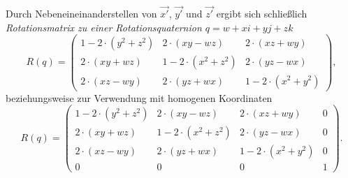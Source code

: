 Durch Nebeneineinanderstellen von $\vec{x'}$, $\vec{y'}$ und $\vec{z'}$ ergibt sich schließlich \emph{Rotationsmatrix zu einer Rotationsquaternion $q = w + xi + yj + zk$}
\begin{equation}
 R(q) =
 \begin{pmatrix}
  1 - 2 \cdot ( y^2 + z^2 ) & 2 \cdot ( xy - wz ) & 2 \cdot ( xz + wy ) \\
  2 \cdot ( xy + wz ) & 1 - 2 \cdot ( x^2 + z^2 ) & 2 \cdot ( yz - wx ) \\
  2 \cdot ( xz - wy ) & 2 \cdot ( yz + wx ) & 1 - 2 \cdot ( x^2 + y^2 )
 \end{pmatrix},
\end{equation}
beziehungsweise zur Verwendung mit homogenen Koordinaten
\begin{equation}
 R(q) =
 \begin{pmatrix}
  1 - 2 \cdot ( y^2 + z^2 ) & 2 \cdot ( xy - wz ) & 2 \cdot ( xz + wy ) & 0 \\
  2 \cdot ( xy + wz ) & 1 - 2 \cdot ( x^2 + z^2 ) & 2 \cdot ( yz - wx ) & 0 \\
  2 \cdot ( xz - wy ) & 2 \cdot ( yz + wx ) & 1 - 2 \cdot ( x^2 + y^2 ) & 0 \\
  0 & 0 & 0 & 1
 \end{pmatrix}.
\end{equation}

